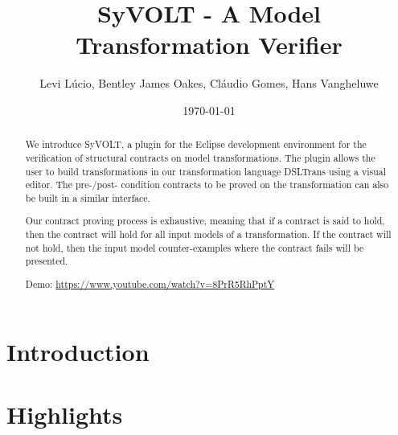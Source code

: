 \documentclass[conference]{IEEEtran}
\begin{document}
\title{SyVOLT - A Model Transformation Verifier}
\author{Levi L\'{u}cio, Bentley James Oakes, Cl\'{a}udio Gomes, Hans Vangheluwe}

\author{
	}

\date{\today}


\maketitle 




\begin{abstract}
 
We introduce SyVOLT, a plugin for the Eclipse development environment for the verification of structural contracts on model transformations. The plugin allows the user to build transformations in our transformation language DSLTrans using a visual editor. The pre-/post- condition contracts to be proved on the transformation can also be built in a similar interface.

Our contract proving process is exhaustive, meaning that if a contract is said to hold, then the contract will hold for all input models of a transformation. If the contract will not hold, then the input model counter-examples where the contract fails will be presented.

Demo: \url{https://www.youtube.com/watch?v=8PrR5RhPptY}



\end{abstract}


\section{Introduction}
\label{sec:intro}


\section{Highlights}
\label{sec:highlights}

\end{document}
